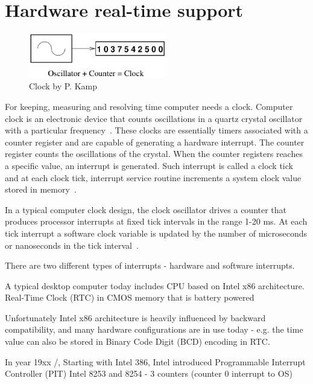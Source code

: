 
\chapter{Hardware real-time support}
\begin{figure}
	\centering
	\includegraphics[width=6cm,keepaspectratio]{fig/clock.png}
	\caption{Clock by P. Kamp}
	\label{fig:hw-clock}
\end{figure}
For keeping, measuring and resolving time computer needs a clock.
Computer clock is an electronic device that counts oscillations in a
quartz crystal oscillator with a particular frequency~\cite{thesis-sync}.
These clocks are essentially timers associated with a counter register and
are capable of generating a hardware interrupt.
The counter register counts the oscillations of the crystal.
When the counter registers reaches a specific value,
an interrupt is generated.
Such interrupt is called a clock tick and at each clock tick,
interrupt service routine increments a system clock value stored in memory~\cite{thesis-sync}.

In a typical computer clock design, the clock oscillator drives a counter that produces processor interrupts at
fixed tick intervals in the range 1-20 ms.
At each tick interrupt a software clock variable is updated by the
number of microseconds or nanoseconds in the tick interval~\cite{timecounters}.


There are two different types of interrupts - hardware and software interrupts.

A typical desktop computer today includes CPU based on Intel x86 architecture.
Real-Time Clock (RTC) in CMOS memory that is battery powered

Unfortunately Intel x86 architecture is heavily influenced by backward compatibility,
and many hardware configurations are in use today -
e.g. the time value can also be stored in Binary Code Digit (BCD) encoding in RTC.

In year 19xx /, Starting with Intel 386,
Intel introduced
Programmable Interrupt Controller (PIT) Intel 8253 and 8254 - 3 counters (counter 0 interrupt to OS)

